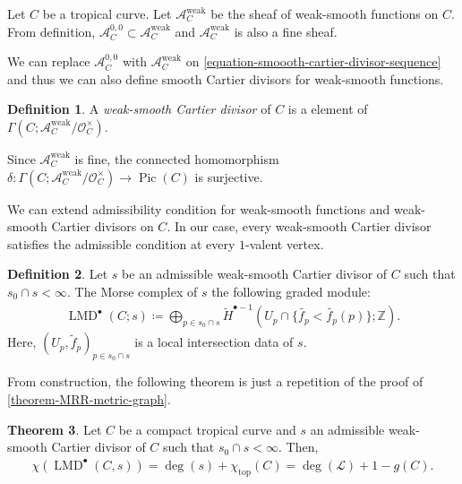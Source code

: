 \documentclass[a4paper,dvipdfmx,reqno,12pt]{amsart}
\theoremstyle{definition}
\newtheorem{theorem}{Theorem}[section]
\newtheorem{definition}[theorem]{Definition}
\newcommand{\deq}{\coloneqq}
\newcommand{\opn}[1]{\operatorname{#1}}
\numberwithin{equation}{section}
\begin{document}
Let $C$ be a tropical curve. 
Let $\mathcal{A}_C^{\opn{weak}}$ be the sheaf 
of weak-smooth functions on $C$. From definition,
$\mathcal{A}_C^{0,0}\subset \mathcal{A}_C^{\opn{weak}}$
and $\mathcal{A}_C^{\opn{weak}}$ is also a fine sheaf.

We can replace $\mathcal{A}_C^{0,0}$ with 
$\mathcal{A}_C^{\opn{weak}}$
on \cref{equation-smoooth-cartier-divisor-sequence}
and thus we can also define smooth Cartier divisors
for weak-smooth functions. 
\begin{definition}
A \emph{weak-smooth Cartier divisor} of $C$ is a 
element of $\Gamma(C;\mathcal{A}_C^{\opn{weak}}/
\mathcal{O}^{\times}_C)$.
\end{definition}

Since $\mathcal{A}_C^{\opn{weak}}$ is fine, 
the connected homomorphism 
$\delta\colon \Gamma(C;\mathcal{A}_C^{\opn{weak}}/
\mathcal{O}^{\times}_C)\to \opn{Pic}(C)$ is 
surjective.


We can extend admissibility condition for
weak-smooth functions and weak-smooth Cartier 
divisors on $C$. In our case, every weak-smooth 
Cartier divisor satisfies the admissible condition 
at every $1$-valent vertex.
\begin{definition}
Let $s$ be an admissible weak-smooth Cartier divisor 
of $C$ such that $s_0\cap s<\infty$.
The Morse complex of $s$ the following graded module:
\begin{align}
  \opn{LMD}^{\bullet}(C;s)\deq \bigoplus_{p\in s_0\cap s} 
\tilde{H}^{\bullet-1}
(U_p\cap \{\tilde{f_p}<\tilde{f_p}(p)\};\mathbb{Z}).
\end{align}
Here, $(U_p,\tilde{f}_p)_{p\in s_0\cap s}$ is a local 
intersection data of $s$.
\end{definition}

From construction, the following theorem is just a
repetition of the proof of 
\cref{theorem-MRR-metric-graph}.

\begin{theorem} \label{theorem-MRR-tropical-curve}
Let $C$ be a compact tropical curve and 
$s$ an admissible weak-smooth Cartier divisor 
of $C$ such that $s_0\cap s<\infty$. Then,
\begin{align}
  \chi(\opn{LMD}^{\bullet}(C,s))=\opn{deg}(s)+
\chi_{\opn{top}}(C)=\opn{deg}(\mathcal{L})+1-g(C).
\end{align}
\end{theorem}




\end{document}

